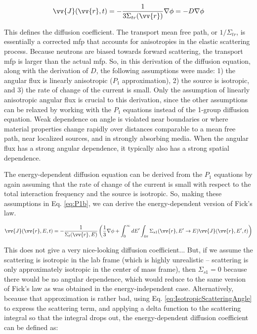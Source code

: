 \documentclass[10pt]{article}
\newcommand{\spas}{(\vv{r},E,t)}
\begin{document}
\begin{flushleft}
\begin{equation}
\label{eq:P1b_CurrentApproximation_2}
\vv{J}(\vv{r},t) =  - \frac{1}{3\Sigma_{tr}(\vv{r})}\nabla\phi = -D\nabla\phi
\end{equation}

This defines the diffusion coefficient. The transport mean free path, or \(1/\Sigma_{tr}\), is essentially a corrected mfp that accounts for anisotropies in the elastic scattering process.  Because neutrons are biased towards forward scattering, the transport mfp is larger than the actual mfp. So, in this derivation of the diffusion equation, along with the derivation of \(D\), the following assumptions were made: 1) the angular flux is linearly anisotropic (\(P_1\) approximation), 2) the source is isotropic, and 3) the rate of change of the current is small. Only the assumption of linearly anisotropic angular flux is crucial to this derivation, since the other assumptions can be relaxed by working with the \(P_1\) equations instead of the 1-group diffusion equation. Weak dependence on angle is violated near boundaries or where material properties change rapidly over distances comparable to a mean free path, near localized sources, and in strongly absorbing media. When the angular flux has a strong angular dependence, it typically also has a strong spatial dependence. 

The energy-dependent diffusion equation can be derived from the \(P_1\) equations by again assuming that the rate of change of the current is small with respect to the total interaction frequency and the source is isotropic. So, making these assumptions in Eq. \ref{eq:P1b}, we can derive the energy-dependent version of Fick's law. 

\begin{equation}
\label{eq:P1b_energyDepdendent}
\vv{J}\spas = - \frac{1}{\Sigma_t(\vv{r},E)}\left(\frac{1}{3}\nabla\phi + \int_{0}^{\infty}dE' \int_{4\pi}^{ } \Sigma_{s1}(\vv{r}, E'\rightarrow E)\vv{J}(\vv{r}, E', t)\right)
\end{equation}

This does not give a very nice-looking diffusion coefficient... But, if we assume the scattering is isotropic in the lab frame (which is highly unrealistic – scattering is only approximately isotropic in the center of mass frame), then \(\Sigma_{s1}=0\) because there would be no angular dependence, which would reduce to the same version of Fick’s law as was obtained in the energy-independent case. Alternatively, bceause that approximation is rather bad, using Eq. \ref{eq:IsotropicScatteringAngle} to express the scattering term, and applying a delta function to the scattering integral so that the integral drops out, the energy-dependent diffusion coefficient can be defined as:


\end{flushleft}
\end{document}
